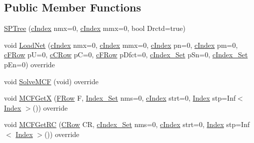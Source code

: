 \subsection*{Public Member Functions}
\begin{DoxyCompactItemize}
\item 
\mbox{\hyperlink{class_s_p_tree_aaeb17eda40b01161160b996e7e0f7f23}{S\+P\+Tree}} (\mbox{\hyperlink{class_m_c_f_class_a76aaabb20535c51a2752b93f6c38fe54}{c\+Index}} nmx=0, \mbox{\hyperlink{class_m_c_f_class_a76aaabb20535c51a2752b93f6c38fe54}{c\+Index}} mmx=0, bool Drctd=true)
\item 
void \mbox{\hyperlink{class_s_p_tree_afbfa5c036f9ea67e35005ec77b82214a}{Load\+Net}} (\mbox{\hyperlink{class_m_c_f_class_a76aaabb20535c51a2752b93f6c38fe54}{c\+Index}} nmx=0, \mbox{\hyperlink{class_m_c_f_class_a76aaabb20535c51a2752b93f6c38fe54}{c\+Index}} mmx=0, \mbox{\hyperlink{class_m_c_f_class_a76aaabb20535c51a2752b93f6c38fe54}{c\+Index}} pn=0, \mbox{\hyperlink{class_m_c_f_class_a76aaabb20535c51a2752b93f6c38fe54}{c\+Index}} pm=0, \mbox{\hyperlink{class_m_c_f_class_ad325f3193dbba0ddef1da4e72d29eda6}{c\+F\+Row}} pU=0, \mbox{\hyperlink{class_m_c_f_class_ab700102e9ba8bb6015be6818d4e99097}{c\+C\+Row}} pC=0, \mbox{\hyperlink{class_m_c_f_class_ad325f3193dbba0ddef1da4e72d29eda6}{c\+F\+Row}} p\+Dfct=0, \mbox{\hyperlink{class_m_c_f_class_a81575b2d4e4d5636b17170432150ae69}{c\+Index\+\_\+\+Set}} p\+Sn=0, \mbox{\hyperlink{class_m_c_f_class_a81575b2d4e4d5636b17170432150ae69}{c\+Index\+\_\+\+Set}} p\+En=0) override
\item 
void \mbox{\hyperlink{class_s_p_tree_aea7d742cb19c17b17fb0832ea74cdb21}{Solve\+M\+CF}} (void) override
\item 
void \mbox{\hyperlink{class_s_p_tree_add59deabe73d1060973c9fd366d8fde8}{M\+C\+F\+GetX}} (\mbox{\hyperlink{class_m_c_f_class_a9dae1f1a39c208ce3c2b337cd5bb3d00}{F\+Row}} F, \mbox{\hyperlink{class_m_c_f_class_ace3388eb329ff0551a0b86b6c67e33d8}{Index\+\_\+\+Set}} nms=0, \mbox{\hyperlink{class_m_c_f_class_a76aaabb20535c51a2752b93f6c38fe54}{c\+Index}} strt=0, \mbox{\hyperlink{class_m_c_f_class_ad53d6229d7ec28555a9c9c2fd9abf773}{Index}} stp=Inf$<$ \mbox{\hyperlink{class_m_c_f_class_ad53d6229d7ec28555a9c9c2fd9abf773}{Index}} $>$()) override
\item 
void \mbox{\hyperlink{class_s_p_tree_aa7cb14464eba4814fef17efc9871b1de}{M\+C\+F\+Get\+RC}} (\mbox{\hyperlink{class_m_c_f_class_a62409402be4e4b301e1a568f99f877be}{C\+Row}} CR, \mbox{\hyperlink{class_m_c_f_class_a81575b2d4e4d5636b17170432150ae69}{c\+Index\+\_\+\+Set}} nms=0, \mbox{\hyperlink{class_m_c_f_class_a76aaabb20535c51a2752b93f6c38fe54}{c\+Index}} strt=0, \mbox{\hyperlink{class_m_c_f_class_ad53d6229d7ec28555a9c9c2fd9abf773}{Index}} stp=Inf$<$ \mbox{\hyperlink{class_m_c_f_class_ad53d6229d7ec28555a9c9c2fd9abf773}{Index}} $>$()) override

\end{DoxyCompactItemize}
